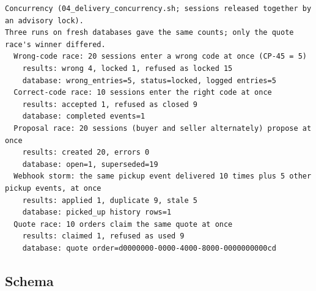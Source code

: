 \documentclass[11pt,a4paper]{article}
\begin{document}
{\begin{verbatim}
Concurrency (04_delivery_concurrency.sh; sessions released together by an advisory lock).
Three runs on fresh databases gave the same counts; only the quote race's winner differed.
  Wrong-code race: 20 sessions enter a wrong code at once (CP-45 = 5)
    results: wrong 4, locked 1, refused as locked 15
    database: wrong_entries=5, status=locked, logged entries=5
  Correct-code race: 10 sessions enter the right code at once
    results: accepted 1, refused as closed 9
    database: completed events=1
  Proposal race: 20 sessions (buyer and seller alternately) propose at once
    results: created 20, errors 0
    database: open=1, superseded=19
  Webhook storm: the same pickup event delivered 10 times plus 5 other pickup events, at once
    results: applied 1, duplicate 9, stale 5
    database: picked_up history rows=1
  Quote race: 10 orders claim the same quote at once
    results: claimed 1, refused as used 9
    database: quote order=d0000000-0000-4000-8000-0000000000cd
\end{verbatim}
}
\subsection{Schema}

\end{document}
